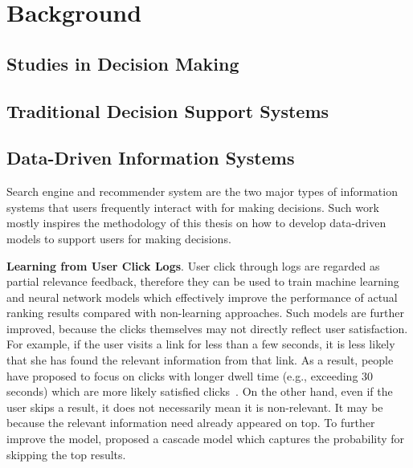 


\section{Background}
\label{ch1:sec1:background}

\subsection{Studies in Decision Making}



\subsection{Traditional Decision Support Systems}

\subsection{Data-Driven Information Systems}

Search engine and recommender system are the two major types of information systems that users frequently interact with for making decisions. Such work mostly inspires the methodology of this thesis on how to develop data-driven models to support users for making decisions. 

\textbf{Learning from User Click Logs}. User click through logs are regarded as partial relevance feedback, therefore they can be used to train machine learning and neural network models which effectively improve the performance of actual ranking results compared with non-learning approaches. Such models are further improved, because the clicks themselves may not directly reflect user satisfaction. For example, if the user visits a link for less than a few seconds, it is less likely that she has found the relevant information from that link. As a result, people have proposed to focus on clicks with longer dwell time (e.g., exceeding 30 seconds) which are more likely satisfied clicks~\cite{kim2014modeling}. On the other hand, even if the user skips a result, it does not necessarily mean it is non-relevant. It may be because the relevant information need already appeared on top. To further improve the model, \cite{Craswell:2008:ECC:1341531.1341545} proposed a cascade model which captures the probability for skipping the top results. 

